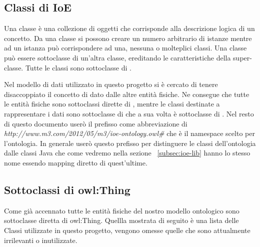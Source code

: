 \subsection{Classi di IoE}

Una classe è una collezione di oggetti che corrisponde alla descrizione logica di un concetto. Da una classe si possono creare un numero arbitrario di istanze mentre ad un istanza può corrispondere ad una, nessuna o molteplici classi.\newline
Una classe può essere sottoclasse di un'altra classe, ereditando le caratteristiche della super-classe. Tutte le classi sono sottoclasse di .

Nel modello di dati utilizzato in questo progetto si è cercato di tenere disaccoppiato il concetto di dato dalle altre entità fisiche. Ne consegue che tutte le entità fisiche sono sottoclassi dirette di , mentre le classi destinate a rappresentare i dati sono sottoclasse di  che a sua volta è sottoclasse di .\newline
Nel resto di questo documento userò il prefisso  come abbreviazione di \emph{http://www.m3.com/2012/05/m3/ioe-ontology.owl\#} che è il namespace scelto per l'ontologia. In generale userò questo prefisso per distinguere le classi dell'ontologia dalle classi Java che come vedremo nella sezione ~\ref{subsec:ioe-lib} hanno lo stesso nome essendo mapping diretto di quest'ultime.

\subsection{Sottoclassi di owl:Thing}

Come già accennato tutte le entità fisiche del nostro modello ontologico sono sottoclasse diretta di owl:Thing. Quellla mostrata di seguito è una lista delle Classi utilizzate in questo progetto, vengono omesse quelle che sono attualmente irrilevanti o inutilizzate.

